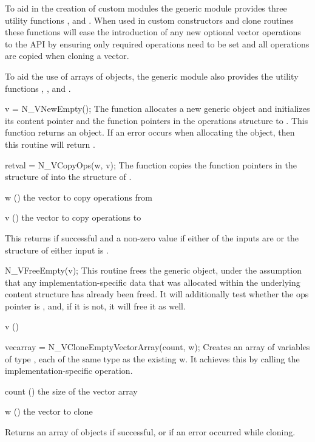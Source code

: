 To aid in the creation of custom {\nvector} modules the generic {\nvector}
module provides three  utility functions , 
and . When used in custom {\nvector} constructors and clone
routines these functions will ease the introduction of any new optional vector
operations to the {\nvector} API by ensuring only required operations need to
be set and all operations are copied when cloning a vector.

To aid the use of arrays of {\nvector} objects, the generic {\nvector} module
also provides the utility functions ,
, and .


{
  v = N\_VNewEmpty();
}
{
  The function  allocates a new generic {\nvector} object and
  initializes its content pointer and the function pointers in the operations
  structure to .
}
{}
{
  This function returns an  object. If an error occurs when
  allocating the object, then this routine will return .
}
{}
{}

{
  retval = N\_VCopyOps(w, v);
}
{
  The function  copies the function pointers in the 
  structure of  into the  structure of .
}
{
  \begin{args}[w]
  \item[w] () the vector to copy operations from
  \item[v] () the vector to copy operations to
  \end{args}
}
{
  This returns  if successful and a non-zero value if either of the inputs
  are  or the  structure of either input is .
}
{}

{
  N\_VFreeEmpty(v);
}
{
  This routine frees the generic  object, under the assumption that any
  implementation-specific data that was allocated within the underlying content structure
  has already been freed. It will additionally test whether the ops pointer is ,
  and, if it is not, it will free it as well.
}
{
  \begin{args}[v]
  \item[v] ()
  \end{args}
}
{}
{}

{
  vecarray = N\_VCloneEmptyVectorArray(count, w);
}
{
  Creates an array of  variables of type ,
  each of the same type as the existing  w. It achieves
  this by calling the implementation-specific  operation.
}
{
  \begin{args}[count]
  \item[count] () the size of the vector array
  \item[w] () the vector to clone
  \end{args}
}
{
  Returns an array of   objects if successful, or
   if an error occurred while cloning.
}
{}

